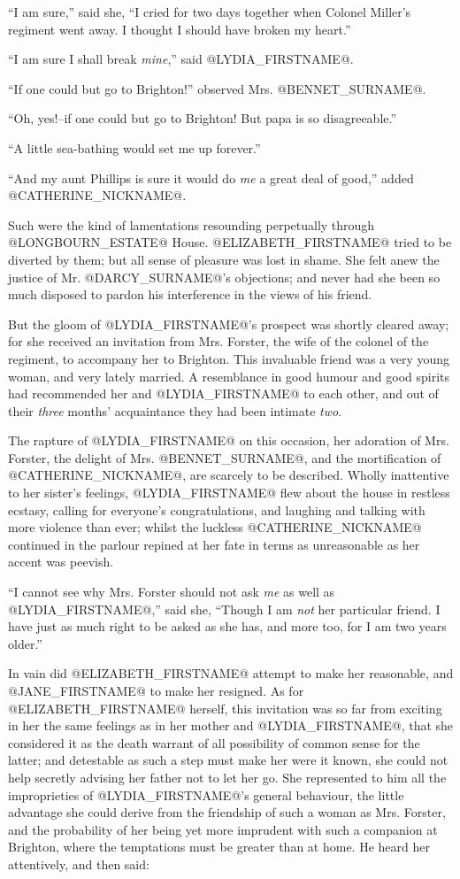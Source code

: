 ``I am sure,'' said she, ``I cried for two days together when Colonel
Miller's regiment went away. I thought I should have broken my heart.''

``I am sure I shall break \textit{mine},'' said @LYDIA_FIRSTNAME@.

``If one could but go to Brighton!'' observed Mrs. @BENNET_SURNAME@.

``Oh, yes!--if one could but go to Brighton! But papa is so
disagreeable.''

``A little sea-bathing would set me up forever.''

``And my aunt Phillips is sure it would do \textit{me} a great deal of good,''
added @CATHERINE_NICKNAME@.

Such were the kind of lamentations resounding perpetually through
@LONGBOURN_ESTATE@ House. @ELIZABETH_FIRSTNAME@ tried to be diverted by them; but all sense
of pleasure was lost in shame. She felt anew the justice of Mr. @DARCY_SURNAME@'s
objections; and never had she been so much disposed to pardon his
interference in the views of his friend.

But the gloom of @LYDIA_FIRSTNAME@'s prospect was shortly cleared away; for she
received an invitation from Mrs. Forster, the wife of the colonel of
the regiment, to accompany her to Brighton. This invaluable friend was a
very young woman, and very lately married. A resemblance in good humour
and good spirits had recommended her and @LYDIA_FIRSTNAME@ to each other, and out of
their \textit{three} months' acquaintance they had been intimate \textit{two}.

The rapture of @LYDIA_FIRSTNAME@ on this occasion, her adoration of Mrs. Forster,
the delight of Mrs. @BENNET_SURNAME@, and the mortification of @CATHERINE_NICKNAME@, are scarcely
to be described. Wholly inattentive to her sister's feelings, @LYDIA_FIRSTNAME@
flew about the house in restless ecstasy, calling for everyone's
congratulations, and laughing and talking with more violence than ever;
whilst the luckless @CATHERINE_NICKNAME@ continued in the parlour repined at her fate
in terms as unreasonable as her accent was peevish.

``I cannot see why Mrs. Forster should not ask \textit{me} as well as @LYDIA_FIRSTNAME@,''
said she, ``Though I am \textit{not} her particular friend. I have just as much
right to be asked as she has, and more too, for I am two years older.''

In vain did @ELIZABETH_FIRSTNAME@ attempt to make her reasonable, and @JANE_FIRSTNAME@ to make
her resigned. As for @ELIZABETH_FIRSTNAME@ herself, this invitation was so far from
exciting in her the same feelings as in her mother and @LYDIA_FIRSTNAME@, that she
considered it as the death warrant of all possibility of common sense
for the latter; and detestable as such a step must make her were it
known, she could not help secretly advising her father not to let her
go. She represented to him all the improprieties of @LYDIA_FIRSTNAME@'s general
behaviour, the little advantage she could derive from the friendship of
such a woman as Mrs. Forster, and the probability of her being yet more
imprudent with such a companion at Brighton, where the temptations must
be greater than at home. He heard her attentively, and then said:

